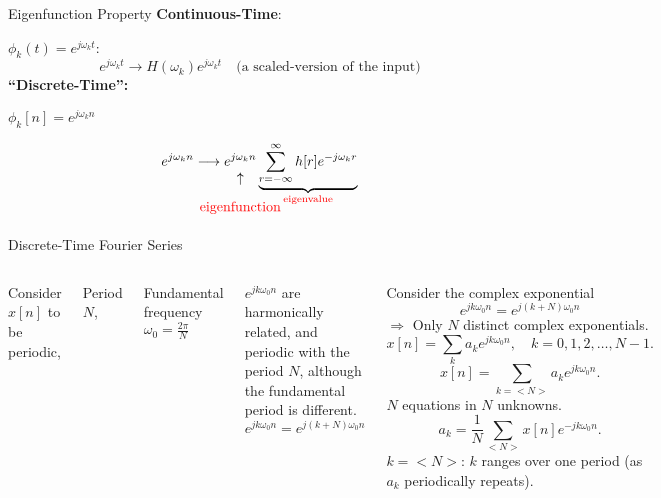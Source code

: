 \begin{frame}{Eigenfunction Property}
    \textbf{Continuous-Time}:\par
    $\phi_k(t) = e^{j\omega_k t}$:
    \begin{equation*}
        e^{j\omega_k t} \longrightarrow H(\omega_k) e^{j\omega_k t} \quad \text{(a scaled-version of the input)}
    \end{equation*}
    \textbf{``Discrete-Time'':}\pause
    {
        $\phi_k[n] = e^{j\omega_k n}$\par
        \begin{equation*}
            e^{j\omega_k n} \longrightarrow
            \underset{\mathclap{\tikz \node {$\uparrow$} node [below=3ex, text=red] {eigenfunction};}}{
            e^{j\omega_k n}
            }
            \underbrace{
            \sum_{r=-\infty}^{\infty} h[r]e^{-j\omega_k r}
            }_{\textcolor{red}{\text{eigenvalue}}}
        \end{equation*}
    }
\end{frame}




\begin{frame}{Discrete-Time Fourier Series}
    {
        \begin{columns}
                Consider $x[n]$ to be periodic,\par
                Period $N$,\par
                Fundamental frequency $\omega_0 = \frac{2\pi}{N}$\par
                $e^{jk\omega_0 n}$ are harmonically related, and periodic with the period $N$, although the fundamental period is different.
                $e^{jk\omega_0 n} = e^{j(k+N)\omega_0 n}$\par
                \par\pause
                Consider the complex exponential
                \begin{equation*}
                    e^{jk\omega_0n} = e^{j(k+N)\omega_0n}
                \end{equation*}
                $\Rightarrow$ Only $N$ distinct complex exponentials.
                \begin{equation*}
                    x[n] = \sum_k a_k e^{jk\omega_0 n}, \quad k = 0,1, 2, \dots, N-1.
                \end{equation*}
                \begin{equation*}
                    x[n] = \sum_{k=<N>} a_k e^{jk\omega_0 n}.
                \end{equation*}
                $N$ equations in $N$ unknowns.
                \begin{equation*}
                    a_k = \frac{1}{N}\sum_{<N>} x[n]e^{-jk\omega_0 n}.
                \end{equation*}
                $k = <N>$: $k$ ranges over one period (as $a_k$ periodically repeats).
        \end{columns}
    }
\end{frame}


